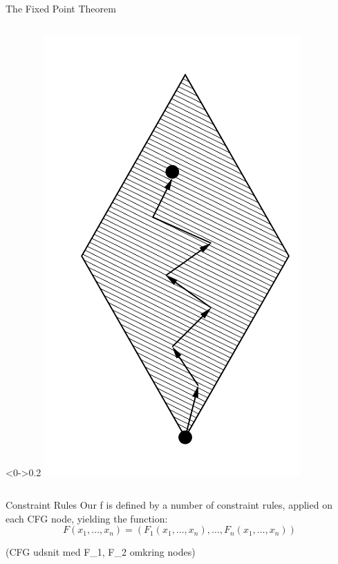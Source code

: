 \begin{frame}{The Fixed Point Theorem}
\begin{columns}[c]
    \begin{column}<0->{0.2\textwidth}
      \includegraphics[width=\textwidth]{graphics/fixed-point_walk}
    \end{column}
  \end{columns}
\end{frame}


\begin{frame}{Constraint Rules}{}
  Our f is defined by a number of constraint rules, applied on each CFG node, yielding the function:
  \[ F(x_1, \dots, x_n) = (F_1(x_1, \dots, x_n), \dots, F_n(x_1, \dots, x_n)) \]

  (CFG udsnit med F\_1, F\_2 omkring nodes)
\end{frame}


